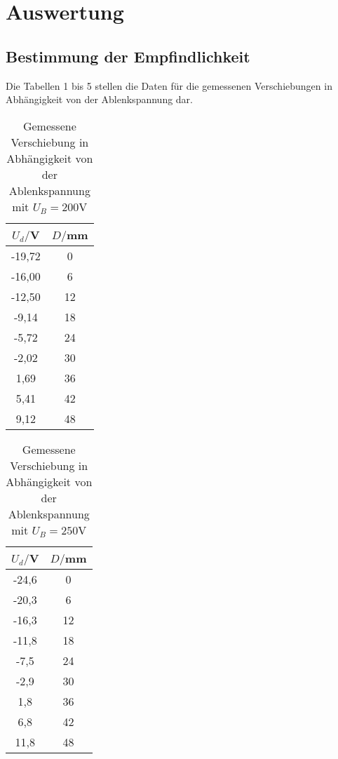 \section{Auswertung}
\label{sec:Auswertung}

\subsection{Bestimmung der Empfindlichkeit}

Die Tabellen 1 bis 5 stellen die Daten für die gemessenen Verschiebungen in Abhängigkeit von
der Ablenkspannung dar.

\begin{table}[H]
  \centering
  \caption{Gemessene Verschiebung in Abhängigkeit von der Ablenkspannung mit $U_B=200$V}
  \label{tab:Spannungsamplitude}
  \begin{tabular}{c c}
    \toprule
    $U_d/$V & $D/$mm \\
    \midrule
    -19,72 & 0 \\
    -16,00 & 6 \\
    -12,50 & 12 \\
     -9,14 & 18 \\
     -5,72 & 24 \\
     -2,02 & 30 \\
      1,69 & 36 \\
      5,41 & 42 \\
      9,12 & 48 \\
    \bottomrule
  \end{tabular}
\end{table}

\begin{table}[H]
  \centering
  \caption{Gemessene Verschiebung in Abhängigkeit von der Ablenkspannung mit $U_B=250$V}
  \label{tab:Spannungsamplitude}
  \begin{tabular}{c c}
    \toprule
    $U_d/$V & $D/$mm \\
    \midrule
     -24,6 & 0 \\
     -20,3 & 6 \\
     -16,3 & 12 \\
     -11,8 & 18 \\
      -7,5 & 24 \\
      -2,9 & 30 \\
       1,8 & 36 \\
       6,8 & 42 \\
      11,8 & 48 \\
    \bottomrule
  \end{tabular}
\end{table}



